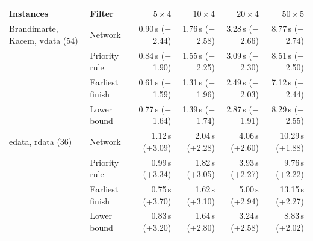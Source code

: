 \begin{tabular}{@{}llrrrr@{}}
\toprule
Instances & Filter & $5 \times 4$ & $10 \times 4$ & $20 \times 4$ & $50 \times 5$ \\
\midrule
Brandimarte, Kacem, vdata (54) & Network & 0.90\,s ($-$2.44) & 1.76\,s ($-$2.58) & 3.28\,s ($-$2.66) & 8.77\,s ($-$2.74) \\
 & Priority rule & 0.84\,s ($-$1.90) & 1.55\,s ($-$2.25) & 3.09\,s ($-$2.30) & 8.51\,s ($-$2.50) \\
 & Earliest finish & 0.61\,s ($-$1.59) & 1.31\,s ($-$1.96) & 2.49\,s ($-$2.03) & 7.12\,s ($-$2.44) \\
 & Lower bound & 0.77\,s ($-$1.64) & 1.39\,s ($-$1.74) & 2.87\,s ($-$1.91) & 8.29\,s ($-$2.55) \\
\midrule
edata, rdata (36) & Network & 1.12\,s (+3.09) & 2.04\,s (+2.28) & 4.06\,s (+2.60) & 10.29\,s (+1.88) \\
 & Priority rule & 0.99\,s (+3.34) & 1.82\,s (+3.05) & 3.93\,s (+2.27) & 9.76\,s (+2.22) \\
 & Earliest finish & 0.75\,s (+3.70) & 1.62\,s (+3.10) & 5.00\,s (+2.94) & 13.15\,s (+2.27) \\
 & Lower bound & 0.83\,s (+3.20) & 1.64\,s (+2.80) & 3.24\,s (+2.58) & 8.83\,s (+2.02) \\
\bottomrule
\end{tabular}
